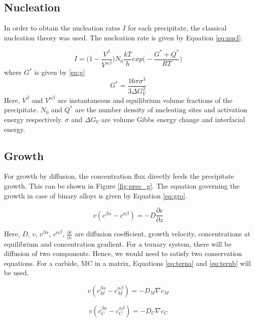 \documentclass[12pt]{article}
\begin{document}
\subsection{Nucleation}
In order to obtain the nucleation rates $I$ for each precipitate, the classical nucleation theory was used. The nucleation rate is given by Equation \ref{eq:nucl}.

\begin{equation}
I=\bigg(1-\frac{V^\beta}{V^{\alpha \beta}}\bigg)N_0\frac{kT}{h}exp\bigg(-\frac{G^*+Q^*}{RT}\bigg)
\label{eq:nucl}
\end{equation}
where $G^*$ is given by \ref{eq:g}
\begin{equation}
G^*=\frac{16\pi \sigma^3}{3\Delta G_V^2}
\label{eq:g}
\end{equation}
Here, $V^\beta$ and $V^{\alpha \beta}$ are instantaneous and equilibrium volume fractions of the precipitate. $N_0$ and $Q^*$ are the number density of nucleating sites and activation energy respectively. $\sigma$ and $\Delta G_V$ are volume Gibbs energy change and interfacial energy. 

\subsection{Growth}

For growth by diffusion, the concentration flux directly feeds the precipitate growth. This can be shown in Figure \ref{fig:prec_g}. The equation governing the growth in case of binary alloys is given by Equation \ref{eq:gro}. 

\begin{equation}
v(c^{\beta \alpha}-c^{\alpha \beta})=-D\frac{\partial c}{\partial z}
\label{eq:gro}
\end{equation}
 
Here, $D$, $v$, $c^{\beta \alpha}$, $c^{\alpha \beta}$, $\frac{\partial c}{\partial z}$ are diffusion coefficient, growth velocity, concentrations at equilibrium and concentration gradient. 
For a ternary system, there will be diffusion of two components. Hence, we would need to satisfy two conservation equations. For a carbide, MC in a matrix, Equations \ref{eq:terna} and \ref{eq:ternb} will be used.

\begin{equation}
v(c_M^{\beta \alpha}-c_M^{\alpha \beta})=-D_M\nabla c_M
\label{eq:terna}
\end{equation}

\begin{equation}
v(c_C^{\beta \alpha}-c_C^{\alpha \beta})=-D_C\nabla c_C
\label{eq:ternb}
\end{equation}
\end{document}

